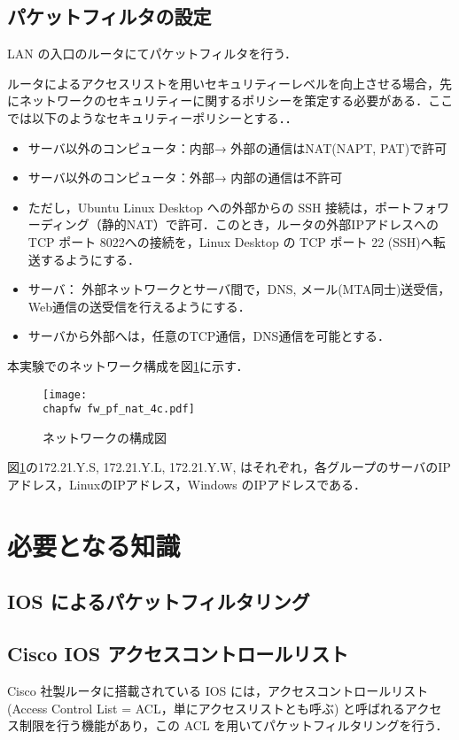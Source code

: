 \subsection*{パケットフィルタの設定}

LAN の入口のルータにてパケットフィルタを行う．

ルータによるアクセスリストを用いセキュリティーレベルを向上させる場合，先にネットワークのセキュリティーに関するポリシーを策定する必要がある．ここでは以下のようなセキュリティーポリシーとする．．

\begin{itemize}
 \item サーバ以外のコンピュータ：内部→ 外部の通信はNAT(NAPT, PAT)で許可
  \item サーバ以外のコンピュータ：外部→ 内部の通信は不許可
  \item ただし，Ubuntu Linux Desktop への外部からの SSH 接続は，ポートフォワーディング（静的NAT）で許可．このとき，ルータの外部IPアドレスへの TCP ポート 8022への接続を，Linux Desktop の TCP ポート 22 (SSH)へ転送するようにする． 
  \item サーバ： 外部ネットワークとサーバ間で，DNS, メール(MTA同士)送受信，Web通信の送受信を行えるようにする．
  \item サーバから外部へは，任意のTCP通信，DNS通信を可能とする．
\end{itemize}
本実験でのネットワーク構成を図\ref{fig:06:packet-filter}に示す．
\begin{figure}
  \centering
  \texttt{[image: \\chapfw fw\_pf\_nat\_4c.pdf]}
  \caption{ネットワークの構成図}
  \label{fig:06:packet-filter}
\end{figure}
図\ref{fig:06:packet-filter}の172.21.Y.S, 172.21.Y.L, 172.21.Y.W, はそれぞれ，各グループのサーバのIPアドレス，LinuxのIPアドレス，Windows のIPアドレスである．

\section{必要となる知識}

\subsection{IOS によるパケットフィルタリング}

\subsection*{Cisco IOS アクセスコントロールリスト}
Cisco 社製ルータに搭載されている IOS には，アクセスコントロールリスト
(Access Control List = ACL，単にアクセスリストとも呼ぶ) と呼ばれるアクセ
ス制限を行う機能があり，この ACL を用いてパケットフィルタリングを行う．

